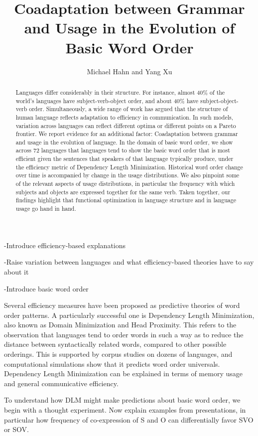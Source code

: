 \documentclass[11pt,a4paper]{article}
\title{Coadaptation between Grammar and Usage in the Evolution of Basic Word Order}
\author{Michael Hahn and Yang Xu}
\begin{document}
\maketitle


\begin{abstract}
Languages differ considerably in their structure.
For instance, almost 40\% of the world's languages have subject-verb-object order, and about 40\% have subject-object-verb order.
Simultaneously, a wide range of work has argued that the structure of human language reflects adaptation to efficiency in communication.
In such models, variation across languages can reflect different optima or different points on a Pareto frontier.
We report evidence for an additional factor:
Coadaptation between grammar and usage in the evolution of language.
In the domain of basic word order, we show across 72 languages that languages tend to show the basic word order that is most efficient given the sentences that speakers of that language typically produce, under the efficiency metric of Dependency Length Minimization.
Historical word order change  over time is accompanied by change in the usage distributions.
We also pinpoint some of the relevant aspects of usage distributions, in particular the frequency with which subjects and objects are expressed together for the same verb.
Taken together, our findings highlight that functional optimization in language structure and in language usage go hand in hand.
\end{abstract}


-Introduce efficiency-based explanations

-Raise variation between languages and what efficiency-based theories have to say about it

-Introduce basic word order

Several efficiency measures have been proposed as predictive theories of word order patterns.
A particularly successful one is Dependency Length Minimization, also known as Domain Minimization and Head Proximity.
This refers to the observation that languages tend to order words in such a way as to reduce the distance between syntactically related words, compared to other possible orderings.
This is supported by corpus studies on dozens of languages, and computational simulations show that it predicts word order universals.
Dependency Length Minimization can be explained in terms of memory usage and general communicative efficiency.


To understand how DLM might make predictions about basic word order, we begin with a thought experiment. Now explain examples from presentations, in particular how frequency of co-expression of S and O can differentially favor SVO or SOV.
\end{document}
